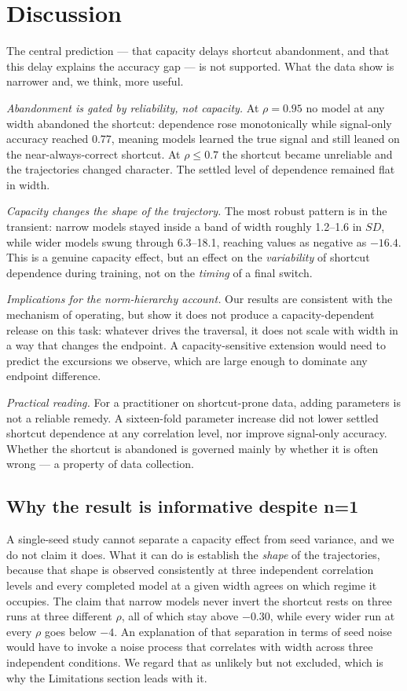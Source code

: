 \documentclass[conference]{IEEEtran}
\begin{document}
\section{Discussion}

The central prediction --- that capacity delays shortcut abandonment, and that this delay
explains the accuracy gap --- is not supported. What the data show is narrower and, we
think, more useful.

\textit{Abandonment is gated by reliability, not capacity.} At $\rho{=}0.95$ no model at
any width abandoned the shortcut: dependence rose monotonically while signal-only accuracy
reached 0.77, meaning models learned the true signal and still leaned on the
near-always-correct shortcut. At $\rho\le0.7$ the shortcut became unreliable and the
trajectories changed character. The settled level of dependence remained flat in width.

\textit{Capacity changes the shape of the trajectory.} The most robust pattern is in the
transient: narrow models stayed inside a band of width roughly 1.2--1.6 in $SD$, while
wider models swung through 6.3--18.1, reaching values as negative as $-16.4$. This is a
genuine capacity effect, but an effect on the \emph{variability} of shortcut dependence
during training, not on the \emph{timing} of a final switch.

\textit{Implications for the norm-hierarchy account.} Our results are consistent with the
mechanism of \cite{nht2026} operating, but show it does not produce a capacity-dependent
release on this task: whatever drives the traversal, it does not scale with width in a way
that changes the endpoint. A capacity-sensitive extension would need to predict the
excursions we observe, which are large enough to dominate any endpoint difference.

\textit{Practical reading.} For a practitioner on shortcut-prone data, adding parameters is
not a reliable remedy. A sixteen-fold parameter increase did not lower settled shortcut
dependence at any correlation level, nor improve signal-only accuracy. Whether the shortcut
is abandoned is governed mainly by whether it is often wrong --- a property of data
collection.

\subsection{Why the result is informative despite n=1}

A single-seed study cannot separate a capacity effect from seed variance, and we do not
claim it does. What it can do is establish the \emph{shape} of the trajectories, because
that shape is observed consistently at three independent correlation levels and every
completed model at a given width agrees on which regime it occupies. The claim that narrow
models never invert the shortcut rests on three runs at three different $\rho$, all of
which stay above $-0.30$, while every wider run at every $\rho$ goes below $-4$. An
explanation of that separation in terms of seed noise would have to invoke a noise process
that correlates with width across three independent conditions. We regard that as unlikely
but not excluded, which is why the Limitations section leads with it.
\end{document}
